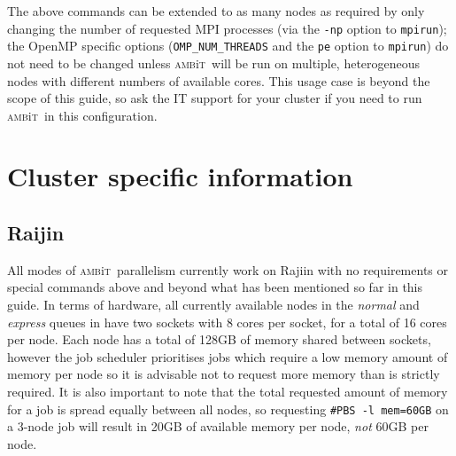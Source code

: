 \documentclass{report}
\newcommand{\ambit}{\textsc{amb}{\footnotesize i}\textsc{t}}
\begin{document}

The above commands can be extended to as many nodes as required by only changing the number of
requested MPI processes (via the \texttt{-np} option to \texttt{mpirun}); the OpenMP specific options
(\texttt{OMP\_NUM\_THREADS} and the \texttt{pe} option to \texttt{mpirun}) do not need to be changed
unless \ambit\ will be run on multiple, heterogeneous nodes with different numbers of available cores.
This usage case is beyond the scope of this guide, so ask the IT support for your cluster if you need to 
run \ambit\ in this configuration.

\section{Cluster specific information}
\label{sec:cluster_specific}
\subsection{Raijin}
All modes of \ambit\ parallelism currently work on Rajiin with no requirements or special commands above 
and beyond what has been mentioned so far in this guide. In terms of hardware, all currently available 
nodes in the \textit{normal} and \textit{express} queues in have two sockets with 8 cores per socket, 
for a total of 16 cores per node. Each node has a total of 128GB of memory shared between sockets,
however the job scheduler prioritises jobs which require a low memory amount of memory per node so it is 
advisable not to request more memory than is strictly required. It is also important to note that the
total requested amount of memory for a job is spread equally between all nodes, so requesting
\texttt{\#PBS -l mem=60GB} on a 3-node job will result in 20GB of available memory per node, \emph{not}
60GB per node.
\end{document}
